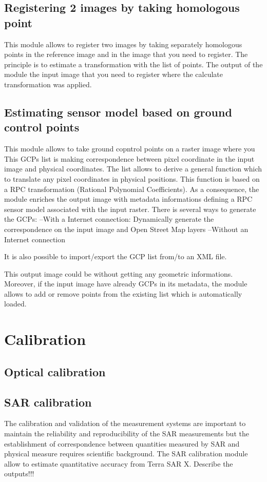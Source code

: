 \documentclass{InsightSoftwareGuide}
\begin{document}
\subsection{Registering 2 images by taking homologous point}
This module allows to register two images by taking separately homologous points in the reference image and in the image 
that you need to register. The principle is to estimate a transformation with the list of points.
The output of the module the input image that you need to register where the calculate transformation was applied. 
\subsection{Estimating sensor model based on ground control points}
This module allows to take ground copntrol points on a raster image where you 
This GCPs list is making correspondence between pixel coordinate in the input image and physical coordinates. The list
allows to derive a general function which to translate any pixel coordinates in physical positions. This function is 
based on a RPC transformation (Rational Polynomial Coefficients). As a consequence, the module enriches the output image 
with metadata informations defining a RPC sensor model associated with the input raster. 
There is several ways to generate the GCPs:
--With a Internet connection: Dynamically generate the correspondence on the input image and Open Street Map layers
--Without an  Internet connection

It is also possible to import/export the GCP list from/to an XML file.

This output image could be without getting any geometric informations. Moreover, if the input image have already GCPs
in its metadata, the module allows to add or remove points from the existing list which is automatically loaded.       

\section{Calibration}

\subsection{Optical calibration}
\subsection{SAR calibration}

The calibration and validation of the measurement systems are important to maintain the
reliability and reproducibility of the SAR measurements but the establishment of correspondence between quantities measured 
by SAR and physical measure requires scientific background. The SAR calibration module allow to estimate quantitative accuracy
from Terra SAR X.
Describe the outputs!!!
\end{document}
